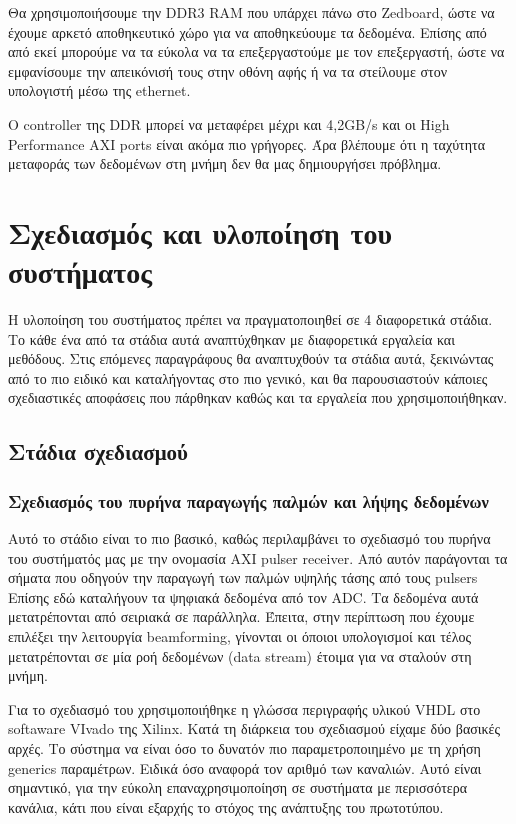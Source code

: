 \documentclass[12pt,a4paper]{book}
\begin{document}
Θα χρησιμοποιήσουμε την DDR3 RAM που υπάρχει πάνω στο Zedboard, ώστε να έχουμε αρκετό αποθηκευτικό χώρο για να αποθηκεύουμε τα δεδομένα. Επίσης από από εκεί μπορούμε να τα εύκολα να τα επεξεργαστούμε με τον επεξεργαστή, ώστε να εμφανίσουμε την απεικόνισή τους στην οθόνη αφής ή να τα στείλουμε στον υπολογιστή μέσω της ethernet. 

Ο controller της DDR μπορεί να μεταφέρει μέχρι και 4,2GB/s και οι High Performance AXI ports είναι ακόμα πιο γρήγορες. Άρα βλέπουμε ότι η ταχύτητα μεταφοράς των δεδομένων στη μνήμη δεν θα μας δημιουργήσει πρόβλημα.


\chapter{Σχεδιασμός και υλοποίηση του συστήματος}
Η υλοποίηση του συστήματος πρέπει να πραγματοποιηθεί σε 4 διαφορετικά στάδια. Το κάθε ένα από τα στάδια αυτά αναπτύχθηκαν με διαφορετικά εργαλεία και μεθόδους. Στις επόμενες παραγράφους θα αναπτυχθούν τα στάδια αυτά, ξεκινώντας από το πιο ειδικό και καταλήγοντας στο πιο γενικό, και θα παρουσιαστούν κάποιες σχεδιαστικές αποφάσεις που πάρθηκαν καθώς και τα εργαλεία που χρησιμοποιήθηκαν. 

\section{Στάδια σχεδιασμού}
\subsection{Σχεδιασμός του πυρήνα παραγωγής παλμών και λήψης δεδομένων}
Αυτό το στάδιο είναι το πιο βασικό, καθώς περιλαμβάνει το σχεδιασμό του πυρήνα του συστήματός μας με την ονομασία AXI pulser receiver. Από αυτόν παράγονται τα σήματα που οδηγούν την παραγωγή των παλμών υψηλής τάσης από τους pulsers Επίσης εδώ καταλήγουν τα ψηφιακά δεδομένα από τον ADC. Τα δεδομένα αυτά μετατρέπονται από σειριακά σε παράλληλα. Έπειτα, στην περίπτωση που έχουμε επιλέξει την λειτουργία beamforming, γίνονται οι όποιοι υπολογισμοί και τέλος μετατρέπονται σε μία ροή δεδομένων (data stream) έτοιμα για να σταλούν στη μνήμη.

Για το σχεδιασμό του χρησιμοποιήθηκε η γλώσσα περιγραφής υλικού VHDL στο softaware VIvado της Xilinx. Κατά τη διάρκεια του σχεδιασμού είχαμε δύο βασικές αρχές. Το σύστημα να είναι όσο το δυνατόν πιο παραμετροποιημένο με τη χρήση generics παραμέτρων. Ειδικά όσο αναφορά τον αριθμό των καναλιών. Αυτό είναι σημαντικό, για την εύκολη επαναχρησιμοποίηση σε συστήματα με περισσότερα κανάλια, κάτι που είναι εξαρχής το στόχος της ανάπτυξης του πρωτοτύπου. 
\end{document}
